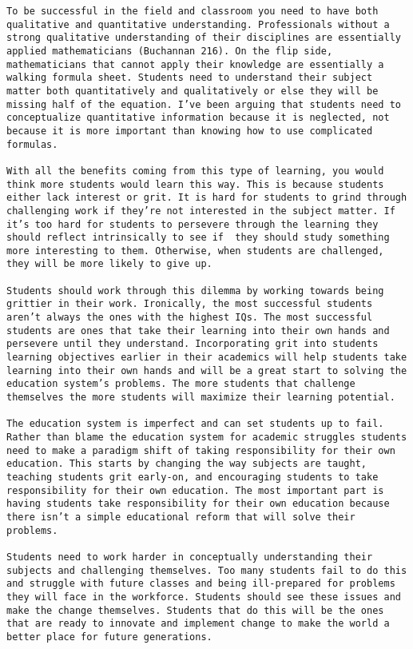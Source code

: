 \documentclass[11pt,]{article}
\begin{document}
\begin{verbatim}
To be successful in the field and classroom you need to have both qualitative and quantitative understanding. Professionals without a strong qualitative understanding of their disciplines are essentially applied mathematicians (Buchannan 216). On the flip side, mathematicians that cannot apply their knowledge are essentially a walking formula sheet. Students need to understand their subject matter both quantitatively and qualitatively or else they will be missing half of the equation. I’ve been arguing that students need to conceptualize quantitative information because it is neglected, not because it is more important than knowing how to use complicated formulas.

With all the benefits coming from this type of learning, you would think more students would learn this way. This is because students either lack interest or grit. It is hard for students to grind through challenging work if they’re not interested in the subject matter. If it’s too hard for students to persevere through the learning they should reflect intrinsically to see if  they should study something more interesting to them. Otherwise, when students are challenged, they will be more likely to give up. 

Students should work through this dilemma by working towards being grittier in their work. Ironically, the most successful students aren’t always the ones with the highest IQs. The most successful students are ones that take their learning into their own hands and persevere until they understand. Incorporating grit into students learning objectives earlier in their academics will help students take learning into their own hands and will be a great start to solving the education system’s problems. The more students that challenge themselves the more students will maximize their learning potential.

The education system is imperfect and can set students up to fail. Rather than blame the education system for academic struggles students need to make a paradigm shift of taking responsibility for their own education. This starts by changing the way subjects are taught, teaching students grit early-on, and encouraging students to take responsibility for their own education. The most important part is having students take responsibility for their own education because there isn’t a simple educational reform that will solve their problems. 

Students need to work harder in conceptually understanding their subjects and challenging themselves. Too many students fail to do this and struggle with future classes and being ill-prepared for problems they will face in the workforce. Students should see these issues and make the change themselves. Students that do this will be the ones that are ready to innovate and implement change to make the world a better place for future generations. 
\end{verbatim}

\newpage
\singlespacing 

\end{document}
